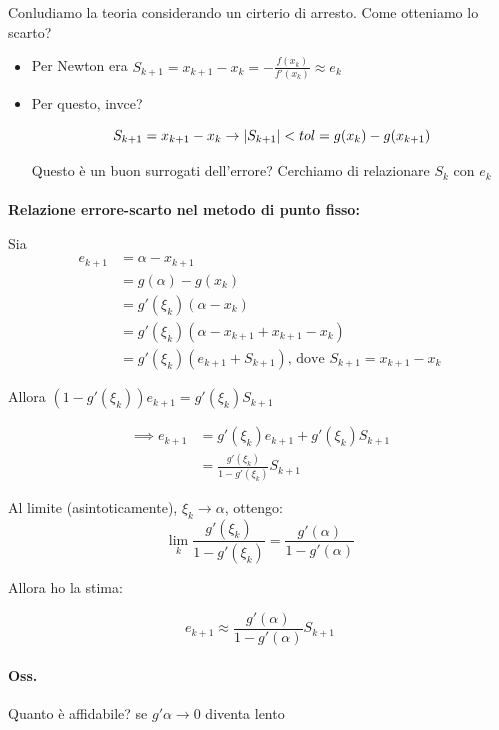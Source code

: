 \documentclass[a4paper, 11pt]{article}
\begin{document}
        Conludiamo la teoria considerando un cirterio di arresto. Come otteniamo lo scarto? 
        \begin{itemize}
            \item Per Newton era  $S_{k+1} = x_{k+1} - x_k = -\frac{f(x_k)}{f'(x_k)} \approx e_k$
            \item Per questo, invce?
            
            $$
                S_{k+1} = x_{k+1}-x_k \rightarrow |S_{k+1}| < tol \\
                = g(x_k) - g(x_{k+1})
            $$

            Questo è un buon surrogati dell'errore? Cerchiamo di relazionare $S_k$ con $e_k$
        \end{itemize}

        \paragraph{}
        \textbf{Relazione errore-scarto nel metodo di punto fisso:}

        Sia
        \begin{align*}
            e_{k+1} &= \alpha - x_{k+1} \\
            &= g(\alpha) - g(x_k) \\
            &= g'(\xi_k)(\alpha - x_k) \\
            &= g'(\xi_k)(\alpha - x_{k+1} + x_{k+1} - x_k) \\
            &= g'(\xi_k)(e_{k+1} + S_{k+1}) \text{, dove $S_{k+1} = x_{k+1} - x_k$} 
        \end{align*}

        Allora $(1-g'(\xi_k))e_{k+1} = g'(\xi_k)S_{k+1}$

        \begin{align*}
            \implies e_{k+1} &= g'(\xi_k)e_{k+1} + g'(\xi_k) S_{k+1} \\
            &= \frac{g'(\xi_k)}{1 - g'(\xi_k)} S_{k+1}
        \end{align*}
        
        Al limite (asintoticamente), $\xi_k \to \alpha$, ottengo:
        $$
            \lim_{k} \frac{g'(\xi_k)}{1-g'(\xi_k)} = \frac{g'(\alpha)}{1-g'(\alpha)}
        $$

        Allora ho la stima:


        $$
            e_{k+1} \approx \frac{g'(\alpha)}{1 - g'(\alpha)} S_{k+1}
        $$

        \paragraph{Oss. } Quanto è affidabile? se $g'\alpha \rightarrow 0$ diventa lento
\end{document}
